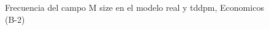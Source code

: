 \begin{figure}[H]
    \centering
    
    \caption{Frecuencia del campo M size en el modelo real y tddpm, Economicos (B-2)}
    \label{frecuency-M Size-tddpm_mlp}
\end{figure}
